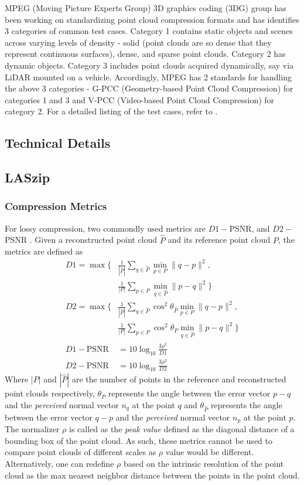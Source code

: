 \documentclass[a4paper, 11pt, twocolumn]{article}
\begin{document}
MPEG (Moving Picture Experts Group) 3D graphics coding (3DG) group has been working on standardizing point cloud compression formats and has identifies 3 categories of common test cases. Category 1 contains static objects and scenes across varying levels of density - solid (point clouds are so dense that they represent continuous surfaces), dense, and sparse point clouds. Category 2 has dynamic objects. Category 3 includes point clouds acquired dynamically, say via LiDAR mounted on a vehicle. Accordingly, MPEG has 2 standards for handling the above 3 categories - G-PCC (Geometry-based Point Cloud Compression) for categories 1 and 3 and V-PCC (Video-based Point Cloud Compression) for category 2. For a detailed listing of the test cases, refer to \cite{mpegx2013MPEG}.

\subsection{Technical Details}

\subsection{LASzip}

\subsubsection{Compression Metrics}

For lossy compression, two commondly used metrics are $D1-$PSNR, and $D2-$PSNR \cite{tian2017geometric}. Given a reconstructed point cloud $\hat{P}$ and its reference point cloud $P$, the metrics are defined as
$$
\begin{aligned}
    D1 = \max \Bigg \{ & \frac{1}{|\hat{P}|} \sum_{q \in \hat{P}} \min_{p \in P} \|q -p\|^2, \\
    & \frac{1}{|P|} \sum_{p \in P} \min_{q \in \hat{P}} \|p -q\|^2 \Bigg \} \\
    D2 = \max \Bigg \{ &\frac{1}{|\hat{P}|} \sum_{q \in \hat{P}} \cos^2 \theta_{\hat{P}}\min_{p \in P} \|q -p\|^2, \\
    & \frac{1}{|P|} \sum_{p \in P} \cos^2 \theta_{P}\min_{q \in \hat{P}} \|p -q\|^2 \Bigg  \} \\
    D1-\text{PSNR} &= 10 \log_{10} \frac{3\rho^2}{D1}  \\
    D2-\text{PSNR} &= 10 \log_{10} \frac{3\rho^2}{D2}
\end{aligned}
$$
Where $|P|$ and $|\hat{P}|$ are the number of points in the reference and reconstructed point clouds respectively, $\theta_P$ represents the angle between the error vector $p - q$ and the \textit{perceived} normal vector $n_q$ at the point $q$ and $\theta_{\hat{P}}$ represents the angle between the error vector $q - p$ and the \textit{perceived} normal vector $n_p$ at the point $p$. The normalizer $\rho$ is called as the \textit{peak value} defined as the diagonal distance of a bounding box of the point cloud. As such, these metrics cannot be used to compare point clouds of different scales as $\rho$ value would be different. Alternatively, one can redefine $\rho$ based on the intrinsic resolution of the point cloud as the max nearest neighbor distance between the points in the point cloud.
\end{document}
